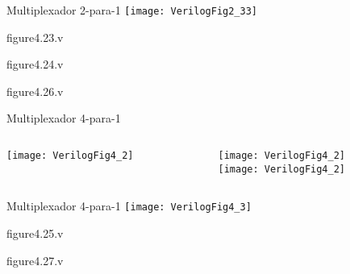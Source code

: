 

\subtitle{Circuitos Combinacionais: Multiplexadores} %



\begin{frame}
	\titlepage
\end{frame} 

\begin{frame}{Multiplexador 2-para-1}   \centering
    \texttt{[image: VerilogFig2\_33]}
\end{frame}

\begin{frame}[fragile]{figure4.23.v}
\end{frame} 

\begin{frame}[fragile]{figure4.24.v}
\end{frame} 

\begin{frame}[fragile]{figure4.26.v}
\end{frame} 

\begin{frame}{Multiplexador 4-para-1}   
    \begin{columns}
        \begin{column}{0.60\textwidth}
        \centering
        \texttt{[image: VerilogFig4\_2]}
        \end{column}
        \begin{column}{0.40\textwidth}
        \texttt{[image: VerilogFig4\_2]} \\
        \texttt{[image: VerilogFig4\_2]}
        \end{column}    
    \end{columns}
\end{frame}

\begin{frame}{Multiplexador 4-para-1}   
    \centering
    \texttt{[image: VerilogFig4\_3]}
\end{frame}

\begin{frame}[fragile]{figure4.25.v}
\end{frame} 

\begin{frame}[fragile]{figure4.27.v}
\end{frame} 

